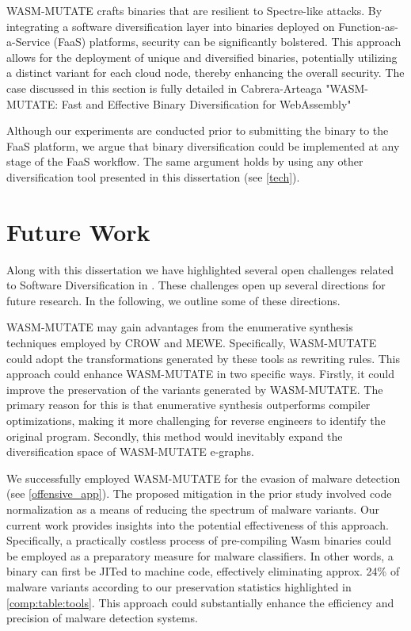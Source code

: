 WASM-MUTATE crafts \Wasm binaries that are resilient to Spectre-like attacks. 
By integrating a software diversification layer into \Wasm binaries deployed on Function-as-a-Service (FaaS) platforms, security can be significantly bolstered. 
This approach allows for the deployment of unique and diversified \Wasm binaries, potentially utilizing a distinct variant for each cloud node, thereby enhancing the overall security.
The case discussed in this section is fully detailed in Cabrera-Arteaga \etal "WASM-MUTATE: Fast and Effective Binary Diversification for WebAssembly"




Although our experiments are conducted prior to submitting the \Wasm binary to the FaaS platform, we argue that \Wasm binary diversification could be implemented at any stage of the FaaS workflow.
The same argument holds by using any other diversification tool presented in this dissertation (see \autoref{tech}).


\section{Future Work}

Along with this dissertation we have highlighted several open challenges related to Software Diversification in \Wasm.
These challenges open up several directions for future research.
In the following, we outline some of these directions.

WASM-MUTATE may gain advantages from the enumerative synthesis techniques employed by CROW and MEWE. 
Specifically, WASM-MUTATE could adopt the transformations generated by these tools as rewriting rules. 
This approach could enhance WASM-MUTATE in two specific ways. 
Firstly, it could improve the preservation of the variants generated by WASM-MUTATE. 
The primary reason for this is that enumerative synthesis outperforms compiler optimizations, making it more challenging for reverse engineers to identify the original program.
Secondly, this method would inevitably expand the diversification space of WASM-MUTATE e-graphs.


 We successfully employed WASM-MUTATE for the evasion of malware detection (see \autoref{offensive_app}). 
The proposed mitigation in the prior study involved code normalization as a means of reducing the spectrum of malware variants. 
Our current work provides insights into the potential effectiveness of this approach. 
Specifically, a practically costless process of pre-compiling Wasm binaries could be employed as a preparatory measure for malware classifiers. 
In other words, a \wasm binary can first be JITed to machine code, effectively eliminating approx. 24\% of malware variants according to our preservation statistics highlighted in \autoref{comp:table:tools}. 
This approach could substantially enhance the efficiency and precision of malware detection systems.




